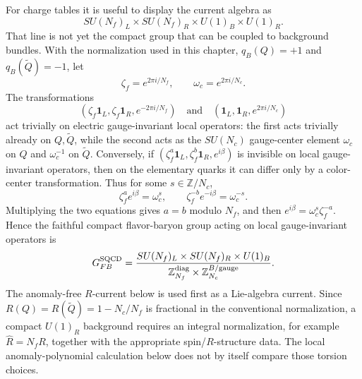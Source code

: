 For charge tables it is useful to display the current algebra as
\[
  SU(N_f)_L\times SU(N_f)_R\times U(1)_B\times U(1)_R .
\]
That line is not yet the compact group that can be coupled to background
bundles.  With the normalization used in this chapter, \(q_B(Q)=+1\) and
\(q_B(\widetilde Q)=-1\), let
\[
  \zeta_f=e^{2\pi i/N_f},
  \qquad
  \omega_c=e^{2\pi i/N_c}.
\]
The transformations
\[
  (\zeta_f\mathbf 1_L,\zeta_f\mathbf 1_R,e^{-2\pi i/N_f})
  \quad\text{and}\quad
  (\mathbf 1_L,\mathbf 1_R,e^{2\pi i/N_c})
\]
act trivially on electric gauge-invariant local operators: the first acts
trivially already on \(Q,\widetilde Q\), while the second acts as the
\(SU(N_c)\) gauge-center element \(\omega_c\) on \(Q\) and \(\omega_c^{-1}\)
on \(\widetilde Q\).  Conversely, if
\((\zeta_f^a\mathbf 1_L,\zeta_f^b\mathbf 1_R,e^{i\beta})\) is invisible on
local gauge-invariant operators, then on the elementary quarks it can differ
only by a color-center transformation.  Thus for some \(s\in\mathbb Z/N_c\),
\begin{equation}
  \zeta_f^a e^{i\beta}=\omega_c^s,
  \qquad
  \zeta_f^{-b} e^{-i\beta}=\omega_c^{-s}.
  \label{eq:sqcd-faithful-kernel-equations}
\end{equation}
Multiplying the two equations gives \(a=b\) modulo \(N_f\), and then
\(e^{i\beta}=\omega_c^s\zeta_f^{-a}\).  Hence the faithful compact
flavor-baryon group acting on local gauge-invariant operators is
\begin{equation}
  G_{FB}^{\rm SQCD}
  =
  \frac{SU(N_f)_L\times SU(N_f)_R\times U(1)_B}
  {\mathbb Z_{N_f}^{\rm diag}\times\mathbb Z_{N_c}^{B/{\rm gauge}}}.
  \label{eq:sqcd-faithful-flavor-baryon-group}
\end{equation}
The anomaly-free \(R\)-current below is used first as a Lie-algebra current.
Since \(R(Q)=R(\widetilde Q)=1-N_c/N_f\) is fractional in the conventional
normalization, a compact \(U(1)_R\) background requires an integral
normalization, for example \(\widehat R=N_fR\), together with the appropriate
spin/\(R\)-structure data.  The local anomaly-polynomial calculation below
does not by itself compare those torsion choices.

